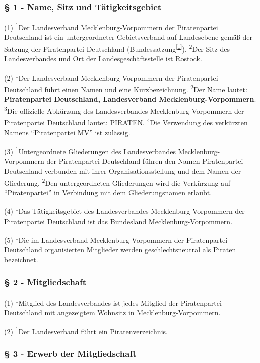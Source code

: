 \subsubsection{§ 1 - Name, Sitz und Tätigkeitsgebiet}

(1) \textsuperscript{1}Der Landesverband Mecklenburg-Vorpommern der
Piratenpartei Deutschland ist ein untergeordneter Gebietsverband auf
Landesebene gemäß der Satzung der Piratenpartei Deutschland
(Bundessatzung\textsuperscript{\href{\#cite\_note-0}{{[}1{]}}}).
\textsuperscript{2}Der Sitz des Landesverbandes und Ort der
Landesgeschäftsstelle ist Rostock.

(2) \textsuperscript{1}Der Landesverband Mecklenburg-Vorpommern der
Piratenpartei Deutschland führt einen Namen und eine Kurzbezeichnung.
\textsuperscript{2}Der Name lautet: \textbf{Piratenpartei Deutschland,
Landesverband Mecklenburg-Vorpommern}. \textsuperscript{3}Die offizielle
Abkürzung des Landesverbandes Mecklenburg-Vorpommern der Piratenpartei
Deutschland lautet: PIRATEN. \textsuperscript{4}Die Verwendung des
verkürzten Namens ``Piratenpartei MV'' ist zulässig.

(3) \textsuperscript{1}Untergeordnete Gliederungen des Landesverbandes
Mecklenburg-Vorpommern der Piratenpartei Deutschland führen den Namen
Piratenpartei Deutschland verbunden mit ihrer Organisationsstellung und
dem Namen der Gliederung. \textsuperscript{2}Den untergeordneten
Gliederungen wird die Verkürzung auf ``Piratenpartei'' in Verbindung mit
dem Gliederungsnamen erlaubt.

(4) \textsuperscript{1}Das Tätigkeitsgebiet des Landesverbandes
Mecklenburg-Vorpommern der Piratenpartei Deutschland ist das Bundesland
Mecklenburg-Vorpommern.

(5) \textsuperscript{1}Die im Landesverband Mecklenburg-Vorpommern der
Piratenpartei Deutschland organisierten Mitglieder werden
geschlechtsneutral als Piraten bezeichnet.

\subsubsection{§ 2 - Mitgliedschaft}

(1) \textsuperscript{1}Mitglied des Landesverbandes ist jedes Mitglied
der Piratenpartei Deutschland mit angezeigtem Wohnsitz in
Mecklenburg-Vorpommern.

(2) \textsuperscript{1}Der Landesverband führt ein Piratenverzeichnis.

\subsubsection{§ 3 - Erwerb der Mitgliedschaft}

